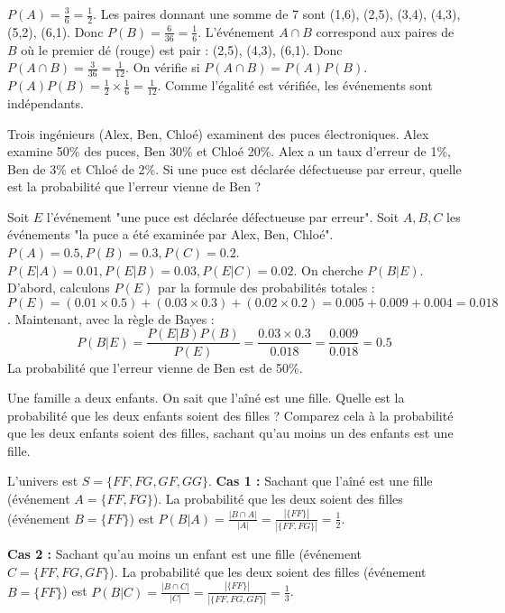 \begin{correctionbox}
$P(A) = \frac{3}{6} = \frac{1}{2}$.
Les paires donnant une somme de 7 sont (1,6), (2,5), (3,4), (4,3), (5,2), (6,1). Donc $P(B) = \frac{6}{36} = \frac{1}{6}$.
L'événement $A \cap B$ correspond aux paires de $B$ où le premier dé (rouge) est pair : (2,5), (4,3), (6,1). Donc $P(A \cap B) = \frac{3}{36} = \frac{1}{12}$.
On vérifie si $P(A \cap B) = P(A)P(B)$.
$P(A)P(B) = \frac{1}{2} \times \frac{1}{6} = \frac{1}{12}$.
Comme l'égalité est vérifiée, les événements sont indépendants.
\end{correctionbox}

\begin{exercicebox}
Trois ingénieurs (Alex, Ben, Chloé) examinent des puces électroniques. Alex examine 50\% des puces, Ben 30\% et Chloé 20\%. Alex a un taux d'erreur de 1\%, Ben de 3\% et Chloé de 2\%. Si une puce est déclarée défectueuse par erreur, quelle est la probabilité que l'erreur vienne de Ben ?
\end{exercicebox}

\begin{correctionbox}
Soit $E$ l'événement "une puce est déclarée défectueuse par erreur".
Soit $A, B, C$ les événements "la puce a été examinée par Alex, Ben, Chloé".
$P(A)=0.5, P(B)=0.3, P(C)=0.2$.
$P(E|A)=0.01, P(E|B)=0.03, P(E|C)=0.02$.
On cherche $P(B|E)$.
D'abord, calculons $P(E)$ par la formule des probabilités totales :
$P(E) = (0.01 \times 0.5) + (0.03 \times 0.3) + (0.02 \times 0.2) = 0.005 + 0.009 + 0.004 = 0.018$.
Maintenant, avec la règle de Bayes :
$$ P(B|E) = \frac{P(E|B)P(B)}{P(E)} = \frac{0.03 \times 0.3}{0.018} = \frac{0.009}{0.018} = 0.5 $$
La probabilité que l'erreur vienne de Ben est de 50\%.
\end{correctionbox}

\begin{exercicebox}
Une famille a deux enfants. On sait que l'aîné est une fille. Quelle est la probabilité que les deux enfants soient des filles ? Comparez cela à la probabilité que les deux enfants soient des filles, sachant qu'au moins un des enfants est une fille.
\end{exercicebox}

\begin{correctionbox}
L'univers est $S = \{FF, FG, GF, GG\}$.
\textbf{Cas 1 :} Sachant que l'aîné est une fille (événement $A = \{FF, FG\}$). La probabilité que les deux soient des filles (événement $B = \{FF\}$) est $P(B|A) = \frac{|B \cap A|}{|A|} = \frac{|\{FF\}|}{|\{FF, FG\}|} = \frac{1}{2}$.

\textbf{Cas 2 :} Sachant qu'au moins un enfant est une fille (événement $C = \{FF, FG, GF\}$). La probabilité que les deux soient des filles (événement $B = \{FF\}$) est $P(B|C) = \frac{|B \cap C|}{|C|} = \frac{|\{FF\}|}{|\{FF, FG, GF\}|} = \frac{1}{3}$.
\end{correctionbox}

